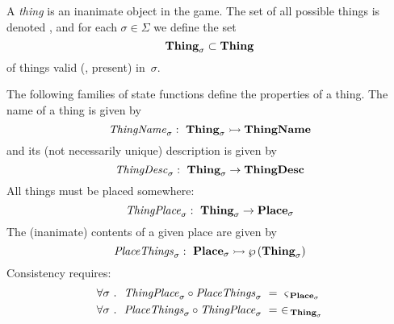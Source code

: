 A {\em thing} is an inanimate object in the game.
The set of all possible things is denoted \thingset{},
and for each $\sigma \in \Sigma$ we define the set
\[ \textbf{Thing}_{\sigma} \subset \textbf{Thing}_{} \]
of things valid (\ie, present) in~$\sigma$.

The following families of
state functions define the properties of a thing.
The name of a thing is given by
\[ \mathit{ThingName}_{\sigma}:~ \textbf{Thing}_{\sigma} \rightarrowtail \textbf{ThingName} \]
and its (not necessarily unique) description is given by
\[ \mathit{ThingDesc}_{\sigma}:~ \textbf{Thing}_{\sigma} \rightarrow \textbf{ThingDesc} \]
All things must be placed somewhere:
\[ \mathit{ThingPlace}_{\sigma}:~ \textbf{Thing}_{\sigma} \rightarrow \textbf{Place}_{\sigma} \]
The (inanimate) contents of a given place are given by
\[ \mathit{PlaceThings}_{\sigma}:~ \textbf{Place}_{\sigma} \rightarrowtail
\wp\left(\textbf{Thing}_{\sigma}\right) \]
Consistency requires:
\begin{align*}
  \forall \sigma &~.~~
  \mathit{ThingPlace}_{\sigma} \circ \mathit{PlaceThings}_{\sigma} ~=~ \mathit{\varsigma_{\,\textbf{Place}_{\sigma}}} \\
  \forall \sigma &~.~~
  \mathit{PlaceThings}_{\sigma} \circ \mathit{ThingPlace}_{\sigma} ~=~ \in_{\,\textbf{Thing}_{\sigma}}
\end{align*}
